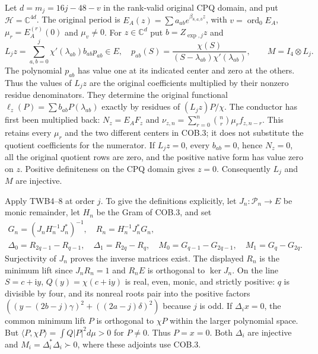 Let $d=m_j=16j-48-v$ in the rank-valid original CPQ domain, and put
$\mathcal H=\mathbb C^{4d}$.  The original period is
$E_A(z)=\sum a_{ab}e^{\beta_{8,a,b}z}$, with
$v=\operatorname{ord}_0E_A$, $\mu_r=E_A^{(r)}(0)$ and $\mu_v\ne0$.
For $z\in\mathbb C^d$ put $b=Z_{\exp,j}z$ and
\[
 L_jz=\sum_{a,b=0}^j\chi'(\lambda_{ab})b_{ab}p_{ab}\in E,
 \quad
 p_{ab}(S)=\frac{\chi(S)}{(S-\lambda_{ab})\chi'(\lambda_{ab})},
 \qquad M=I_4\otimes L_j.
 \tag{COB.4}
\]
The polynomial $p_{ab}$ has value one at its indicated center and zero
at the others.  Thus the values of $L_jz$ are the original coefficients
multiplied by their nonzero residue denominators.  They determine the
original functional
$\ell_z(P)=\sum b_{ab}P(\lambda_{ab})$ exactly by residues of
$(L_jz)P/\chi$.  The conductor has first been multiplied back:
$N_z=E_AF_z$ and
$\nu_{z,n}=\sum_{r=0}^{n}\binom nr\mu_r f_{z,n-r}$.
This retains every $\mu_r$ and the two different centers in COB.3;
it does not substitute the quotient coefficients for the numerator.
If $L_jz=0$, every $b_{ab}=0$, hence $N_z=0$, all the original
quotient rows are zero, and the positive native form has value zero
on $z$.  Positive definiteness on the CPQ domain gives $z=0$.
Consequently $L_j$ and $M$ are injective.

Apply TWB4--8 at order $j$.  To give the definitions explicitly,
let $J_n:\mathcal P_n\to E$ be monic remainder, let $H_n$ be the
Gram of COB.3, and set
\[
 \begin{gathered}
 G_n=(J_nH_n^{-1}J_n^*)^{-1},\quad
 R_n=H_n^{-1}J_n^*G_n,\\
 \Delta_0=R_{2q-1}-R_{q-1},\quad
 \Delta_1=R_{2q}-R_q,\quad
 M_0=G_{q-1}-G_{2q-1},\quad M_1=G_q-G_{2q}.
 \end{gathered}\tag{COB.5}
\]
Surjectivity of $J_n$ proves the inverse matrices exist.  The displayed
$R_n$ is the minimum lift since $J_nR_n=1$ and $R_nE$ is orthogonal
to $\ker J_n$.  On the line $S=c+\mathrm iy$, $Q(y)=\chi(c+\mathrm iy)$
is real, even, monic, and strictly positive: $q$ is divisible by four,
and its nonreal roots pair into the positive factors
$((y-(2b-j)\gamma)^2+((2a-j)\delta)^2)$ because $j$ is odd.
If $\Delta_i x=0$, the common minimum lift $P$ is orthogonal to
$\chi P$ within the larger polynomial space.  But
$\langle P,\chi P\rangle=\int Q|P|^2d\mu>0$ for $P\ne0$.
Thus $P=x=0$.  Both $\Delta_i$ are injective and
$M_i=\Delta_i^*\Delta_i\succ0$, where these adjoints use COB.3.

